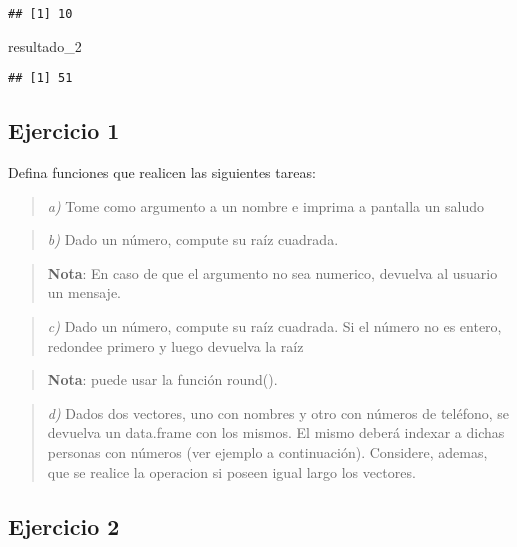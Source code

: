\documentclass[]{article}
\newenvironment{Shaded}{\begin{snugshade}}{\end{snugshade}}
\newcommand{\DecValTok}[1]{\textcolor[rgb]{0.00,0.00,0.81}{#1}}
\newcommand{\NormalTok}[1]{#1}
\begin{document}
\begin{verbatim}
## [1] 10
\end{verbatim}

\begin{Shaded}
\begin{Highlighting}[]
\NormalTok{    resultado_}\DecValTok{2}
\end{Highlighting}
\end{Shaded}

\begin{verbatim}
## [1] 51
\end{verbatim}

\hypertarget{ejercicio-1}{%
\subsection{Ejercicio 1}\label{ejercicio-1}}

Defina funciones que realicen las siguientes tareas:

\begin{quote}
\emph{a)} Tome como argumento a un nombre e imprima a pantalla un saludo
\end{quote}

\begin{quote}
\emph{b)} Dado un número, compute su raíz cuadrada.
\end{quote}

\begin{quote}
\textbf{Nota}: En caso de que el argumento no sea numerico, devuelva al
usuario un mensaje.
\end{quote}

\begin{quote}
\emph{c)} Dado un número, compute su raíz cuadrada. Si el número no es
entero, redondee primero y luego devuelva la raíz
\end{quote}

\begin{quote}
\textbf{Nota}: puede usar la función round().
\end{quote}

\begin{quote}
\emph{d)} Dados dos vectores, uno con nombres y otro con números de
teléfono, se devuelva un data.frame con los mismos. El mismo deberá
indexar a dichas personas con números (ver ejemplo a continuación).
Considere, ademas, que se realice la operacion si poseen igual largo los
vectores.
\end{quote}

\hypertarget{ejercicio-2}{%
\subsection{Ejercicio 2}\label{ejercicio-2}}
\end{document}
